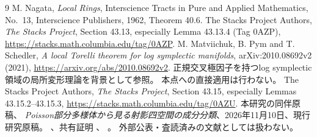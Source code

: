 \documentclass[a4paper,11pt]{ltjsarticle}
\theoremstyle{remark}\newtheorem{remark}[theorem]{注意}
\begin{document}
\begin{thebibliography}{9}
 M. Nagata, \emph{Local Rings},
Interscience Tracts in Pure and Applied Mathematics, No.~13,
Interscience Publishers, 1962, Theorem 40.6.
 The Stacks Project Authors,
\emph{The Stacks Project}, Section 43.13, especially
Lemma 43.13.4 (Tag 0AZP),
\url{https://stacks.math.columbia.edu/tag/0AZP}.
 M. Matviichuk, B. Pym and T. Schedler,
\emph{A local Torelli theorem for log symplectic manifolds},
arXiv:2010.08692v2 (2021), \url{https://arxiv.org/abs/2010.08692v2}.
正規交叉極因子を持つlog symplectic領域の局所変形理論を背景として参照。
本点への直接適用は行わない。
 The Stacks Project Authors,
\emph{The Stacks Project}, Section 43.15, especially Lemmas 43.15.2--43.15.3,
\url{https://stacks.math.columbia.edu/tag/0AZU}.
 本研究の同伴原稿、
\emph{Poisson部分多様体から見る射影四空間の成分分類}、2026年11月10日、現行研究原稿。
、共有証明
、
。
外部公表・査読済みの文献としては扱わない。
\end{thebibliography}
\end{document}
